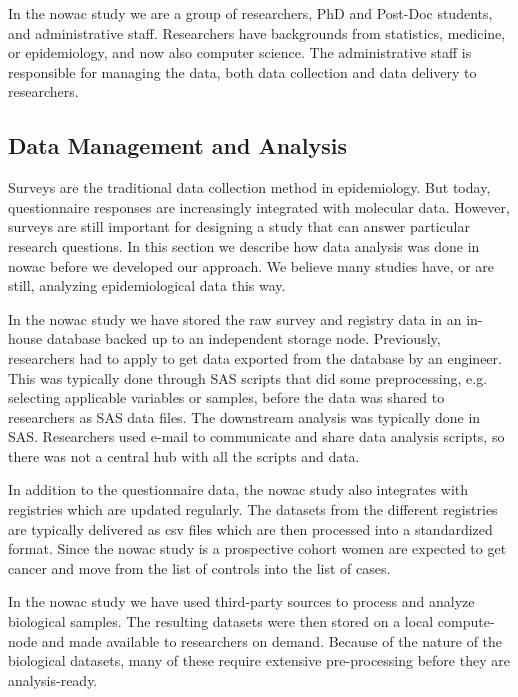 In the \gls{nowac} study we are a group of researchers, PhD and Post-Doc
students, and administrative staff. Researchers have backgrounds from
statistics, medicine, or epidemiology, and now also computer science. The
administrative staff is responsible for managing the data, both data collection
and data delivery to researchers. 


\subsection{Data Management and Analysis} 
Surveys are the traditional data collection method in epidemiology. But
today, questionnaire responses are increasingly integrated with molecular data.
However, surveys are still important for designing a study that can answer
particular research questions.  In this section we describe how data analysis
was done in \gls{nowac} before we developed our approach. We believe many
studies have, or are still, analyzing epidemiological data this way.

In the \gls{nowac} study we have stored the raw survey and registry data in an
in-house database backed up to an independent storage node. Previously,
researchers had to apply to get data exported from the database by an engineer.
This was typically done through SAS scripts that did some preprocessing, e.g.
selecting applicable variables or samples, before the data was shared to
researchers as SAS data files. The downstream analysis was typically done in
SAS. Researchers used e-mail to communicate and share data analysis scripts, so
there was not a central hub with all the scripts and data. 

In addition to the questionnaire data, the \gls{nowac} study also integrates
with registries which are updated regularly. The datasets from the different
registries are typically delivered as \gls{csv} files which are then processed
into a standardized format. Since the \gls{nowac} study is a prospective cohort
women are expected to get cancer and move from the list of controls into the
list of cases. 

In the \gls{nowac} study we have used third-party sources to process and analyze
biological samples. The resulting datasets were then stored on a local
compute-node and made available to researchers on demand. Because of the nature
of the biological datasets, many of these require extensive pre-processing
before they are analysis-ready. 

